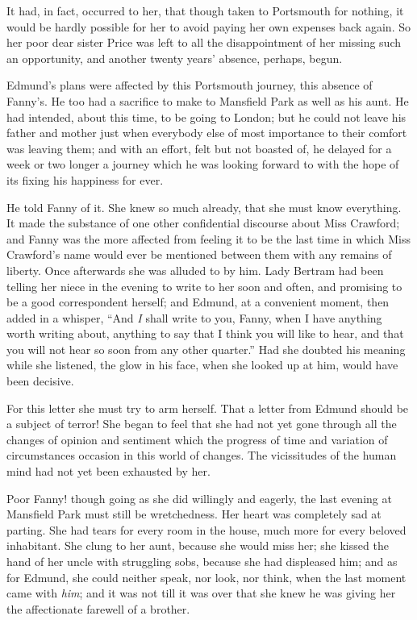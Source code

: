 It had, in fact, occurred to her, that though taken
to Portsmouth for nothing, it would be hardly possible
for her to avoid paying her own expenses back again.
So her poor dear sister Price was left to all the
disappointment of her missing such an opportunity,
and another twenty years' absence, perhaps, begun.

Edmund's plans were affected by this Portsmouth journey,
this absence of Fanny's. He too had a sacrifice to make
to Mansfield Park as well as his aunt.  He had intended,
about this time, to be going to London; but he could
not leave his father and mother just when everybody else
of most importance to their comfort was leaving them;
and with an effort, felt but not boasted of, he delayed
for a week or two longer a journey which he was looking
forward to with the hope of its fixing his happiness
for ever.

He told Fanny of it.  She knew so much already,
that she must know everything.  It made the substance
of one other confidential discourse about Miss Crawford;
and Fanny was the more affected from feeling it to be
the last time in which Miss Crawford's name would ever
be mentioned between them with any remains of liberty.
Once afterwards she was alluded to by him.  Lady Bertram had
been telling her niece in the evening to write to her soon
and often, and promising to be a good correspondent herself;
and Edmund, at a convenient moment, then added in a whisper,
``And \emph{I} shall write to you, Fanny, when I have anything
worth writing about, anything to say that I think you
will like to hear, and that you will not hear so soon
from any other quarter.''  Had she doubted his meaning
while she listened, the glow in his face, when she looked
up at him, would have been decisive.

For this letter she must try to arm herself.  That a
letter from Edmund should be a subject of terror!
She began to feel that she had not yet gone through all
the changes of opinion and sentiment which the progress
of time and variation of circumstances occasion in this
world of changes.  The vicissitudes of the human mind
had not yet been exhausted by her.

Poor Fanny! though going as she did willingly and eagerly,
the last evening at Mansfield Park must still
be wretchedness.  Her heart was completely sad at parting.
She had tears for every room in the house, much more
for every beloved inhabitant.  She clung to her aunt,
because she would miss her; she kissed the hand of her
uncle with struggling sobs, because she had displeased him;
and as for Edmund, she could neither speak, nor look,
nor think, when the last moment came with \emph{him}; and it
was not till it was over that she knew he was giving
her the affectionate farewell of a brother.

